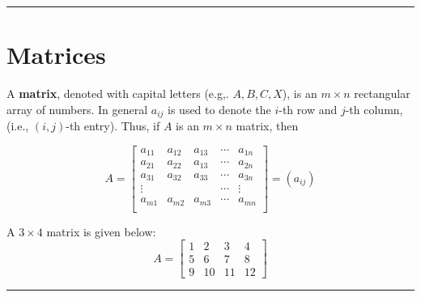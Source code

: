 \rule[0.01in]{\textwidth}{0.0025in}


%
%
\section{Matrices}

 \begin{tcolorbox}[colback=yellow!10!,colframe=gray!15!]
 \begin{definition}[Matrix]
A  \textbf{matrix}, denoted with capital letters (e.g,. $A, B, C, X$), is an $m \times n$ rectangular array of numbers.   In general $a_{ij}$ is used to denote the $i$-th row and $j$-th column, (i.e.,  $(i,j)$-th entry).  Thus, if $A$ is an $m \times n$ matrix, then

\[ 
A =  \begin{bmatrix} 
	a_{11} & a_{12} & a_{13}	& \cdots & a_{1n} \\
 	a_{21} & a_{22} & a_{13}	& \cdots & a_{2n} \\
  	a_{31} & a_{32} & a_{33}	& \cdots & a_{3n} \\
	\vdots 	&	&	& \cdots & \vdots \\
    	a_{m1} & a_{m2} & a_{m3}	& \cdots & a_{mn} \\
    \end{bmatrix}  = (a_{ij})
 \]
 \end{definition}	 
 \end{tcolorbox} 








\begin{example}
A $3 \times 4$ matrix is given below: 
\[ A = \begin{bmatrix}  1& 2& 3 & 4\\ 5 & 6 & 7  & 8\\ 9 & 10 & 11 & 12 \end{bmatrix} \]
\end{example}

\rule[0.01in]{\textwidth}{0.0025in}



